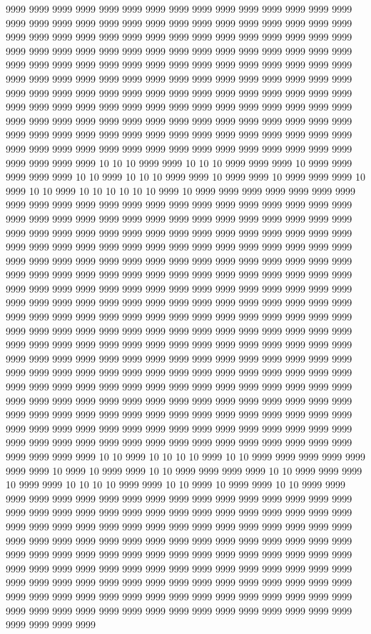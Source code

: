 9999 9999 9999 9999 9999 9999 9999 9999 9999 9999 9999 9999 9999 9999 9999 9999 9999 9999 9999 9999 9999 9999 9999 9999 9999 9999 9999 9999 9999 9999 9999 9999 9999 9999 9999 9999 9999 9999 9999 9999 9999 9999 9999 9999 9999 9999 9999 9999 9999 9999 9999 9999 9999 9999 9999 9999 9999 9999 9999 9999 9999 9999 9999 9999 9999 9999 9999 9999 9999 9999 9999 9999 9999 9999 9999 9999 9999 9999 9999 9999 9999 9999 9999 9999 9999 9999 9999 9999 9999 9999 9999 9999 9999 9999 9999 9999 9999 9999 9999 9999 9999 9999 9999 9999 9999 9999 9999 9999 9999 9999 9999 9999 9999 9999 9999 9999 9999 9999 9999 9999 9999 9999 9999 9999 9999 9999 9999 9999 9999 9999 9999 9999 9999 9999 9999 9999 9999 9999 9999 9999 9999 9999 9999 9999 9999 9999 9999 9999 9999 9999 9999 9999 9999 9999 9999 9999 9999 9999 9999 9999 9999 9999 9999 9999 9999 9999 9999 9999 9999 10 10 10 9999 9999 10 10 10 9999 9999 9999 10 9999 9999 9999 9999 9999 10 10 9999 10 10 10 9999 9999 10 9999 9999 10 9999 9999 9999 10 9999 10 10 9999 10 10 10 10 10 10 9999 10 9999 9999 9999 9999 9999 9999 9999 9999 9999 9999 9999 9999 9999 9999 9999 9999 9999 9999 9999 9999 9999 9999 9999 9999 9999 9999 9999 9999 9999 9999 9999 9999 9999 9999 9999 9999 9999 9999 9999 9999 9999 9999 9999 9999 9999 9999 9999 9999 9999 9999 9999 9999 9999 9999 9999 9999 9999 9999 9999 9999 9999 9999 9999 9999 9999 9999 9999 9999 9999 9999 9999 9999 9999 9999 9999 9999 9999 9999 9999 9999 9999 9999 9999 9999 9999 9999 9999 9999 9999 9999 9999 9999 9999 9999 9999 9999 9999 9999 9999 9999 9999 9999 9999 9999 9999 9999 9999 9999 9999 9999 9999 9999 9999 9999 9999 9999 9999 9999 9999 9999 9999 9999 9999 9999 9999 9999 9999 9999 9999 9999 9999 9999 9999 9999 9999 9999 9999 9999 9999 9999 9999 9999 9999 9999 9999 9999 9999 9999 9999 9999 9999 9999 9999 9999 9999 9999 9999 9999 9999 9999 9999 9999 9999 9999 9999 9999 9999 9999 9999 9999 9999 9999 9999 9999 9999 9999 9999 9999 9999 9999 9999 9999 9999 9999 9999 9999 9999 9999 9999 9999 9999 9999 9999 9999 9999 9999 9999 9999 9999 9999 9999 9999 9999 9999 9999 9999 9999 9999 9999 9999 9999 9999 9999 9999 9999 9999 9999 9999 9999 9999 9999 9999 9999 9999 9999 9999 9999 9999 9999 9999 9999 9999 9999 9999 9999 9999 9999 9999 9999 9999 9999 9999 9999 9999 9999 9999 9999 9999 9999 9999 9999 9999 9999 9999 9999 9999 9999 9999 9999 9999 9999 9999 9999 9999 9999 9999 9999 9999 9999 9999 9999 9999 9999 9999 9999 9999 9999 9999 9999 9999 9999 10 10 9999 10 10 10 10 9999 10 10 9999 9999 9999 9999 9999 9999 9999 10 9999 10 9999 9999 10 10 9999 9999 9999 9999 10 10 9999 9999 9999 10 9999 9999 10 10 10 10 9999 9999 10 10 9999 10 9999 9999 10 10 9999 9999 9999 9999 9999 9999 9999 9999 9999 9999 9999 9999 9999 9999 9999 9999 9999 9999 9999 9999 9999 9999 9999 9999 9999 9999 9999 9999 9999 9999 9999 9999 9999 9999 9999 9999 9999 9999 9999 9999 9999 9999 9999 9999 9999 9999 9999 9999 9999 9999 9999 9999 9999 9999 9999 9999 9999 9999 9999 9999 9999 9999 9999 9999 9999 9999 9999 9999 9999 9999 9999 9999 9999 9999 9999 9999 9999 9999 9999 9999 9999 9999 9999 9999 9999 9999 9999 9999 9999 9999 9999 9999 9999 9999 9999 9999 9999 9999 9999 9999 9999 9999 9999 9999 9999 9999 9999 9999 9999 9999 9999 9999 9999 9999 9999 9999 9999 9999 9999 9999 9999 9999 9999 9999 9999 9999 9999 9999 9999 9999 9999 9999 9999 9999 9999 9999 9999 9999 9999 9999 9999 